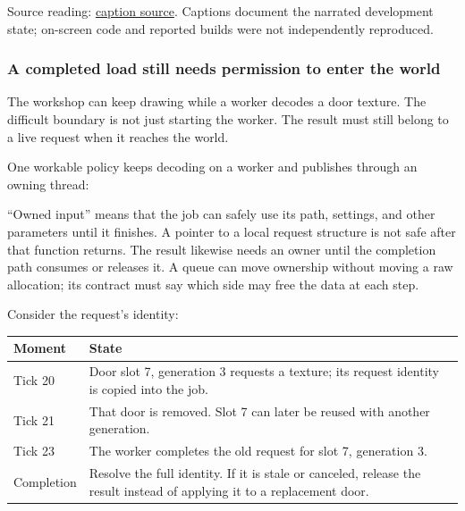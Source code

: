 Source reading: \href{https://www.youtube.com/watch?v=u-eyZCV_MRs}{caption source}. Captions document the narrated development state; on-screen code and reported builds were not independently reproduced.

\subsubsection{A completed load still needs permission to enter the world}\label{06-engine-ii-ch027-a-completed-load-still-needs-permission-to-enter-the-world}

\hypertarget{06-engine-ii-ch027-a-completed-load-still-needs-permission-to-enter-the-world}{}

The workshop can keep drawing while a worker decodes a door texture. The difficult boundary is not just starting the worker. The result must still belong to a live request when it reaches the world.

One workable policy keeps decoding on a worker and publishes through an owning thread:


``Owned input'' means that the job can safely use its path, settings, and other parameters until it finishes. A pointer to a local request structure is not safe after that function returns. The result likewise needs an owner until the completion path consumes or releases it. A queue can move ownership without moving a raw allocation; its contract must say which side may free the data at each step.

Consider the request's identity:

{\def\LTcaptype{none} %
\begin{longtable}[]{@{}
  >{\raggedright\arraybackslash}p{}
  >{\raggedright\arraybackslash}p{}@{}}
\toprule\noalign{}
\begin{minipage}[b]{\linewidth}\raggedright
Moment
\end{minipage} & \begin{minipage}[b]{\linewidth}\raggedright
State
\end{minipage} \\
\midrule\noalign{}
\endhead
\bottomrule\noalign{}
\endlastfoot
Tick 20 & Door slot 7, generation 3 requests a texture; its request identity is copied into the job. \\
Tick 21 & That door is removed. Slot 7 can later be reused with another generation. \\
Tick 23 & The worker completes the old request for slot 7, generation 3. \\
Completion & Resolve the full identity. If it is stale or canceled, release the result instead of applying it to a replacement door. \\
\end{longtable}
}

